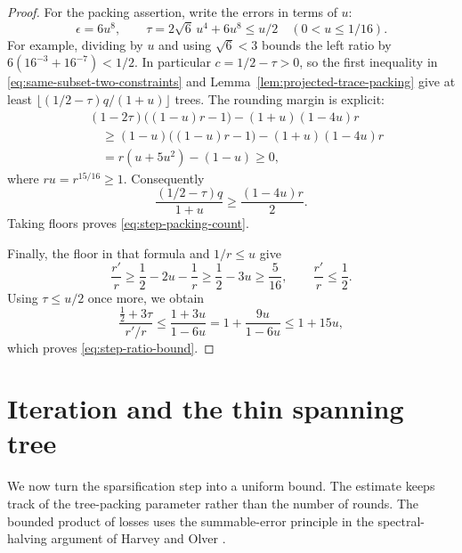 \documentclass[11pt]{amsart}
\theoremstyle{definition}
\theoremstyle{remark}
\numberwithin{equation}{section}
\begin{document}
\begin{proof}
For the packing assertion, write the errors in terms of $u$:
\[
 \epsilon=6u^8,\qquad\tau=2\sqrt6\,u^4+6u^8\leq u/2
 \quad(0<u\leq1/16).
\]
For example, dividing by $u$ and using $\sqrt6<3$ bounds the left
ratio by $6(16^{-3}+16^{-7})<1/2$.
In particular $c=1/2-\tau>0$, so the first inequality in
\eqref{eq:same-subset-two-constraints} and
Lemma~\ref{lem:projected-trace-packing} give at least
$\lfloor(1/2-\tau)q/(1+u)\rfloor$ trees.
The rounding margin is explicit:
\begin{align*}
 &(1-2\tau)\bigl((1-u)r-1\bigr)
            -(1+u)(1-4u)r\\
 &\quad\geq(1-u)\bigl((1-u)r-1\bigr)
            -(1+u)(1-4u)r\\
 &\quad=r(u+5u^2)-(1-u)\geq0,
\end{align*}
where $ru=r^{15/16}\geq1$.  Consequently
\[
 \frac{(1/2-\tau)q}{1+u}\geq\frac{(1-4u)r}{2}.
\]
Taking floors proves \eqref{eq:step-packing-count}.

Finally, the floor in that formula and $1/r\leq u$ give
\[
 \frac{r'}r\geq\frac12-2u-\frac1r
              \geq\frac12-3u\geq\frac5{16},
 \qquad\frac{r'}r\leq\frac12.
\]
Using $\tau\leq u/2$ once more, we obtain
\[
 \frac{\frac12+3\tau}{r'/r}
 \leq\frac{1+3u}{1-6u}
 =1+\frac{9u}{1-6u}\leq1+15u,
\]
which proves \eqref{eq:step-ratio-bound}.
\end{proof}

\section{Iteration and the thin spanning tree}\label{sec:iteration}

We now turn the sparsification step into a uniform bound.
The estimate keeps track of the tree-packing parameter rather than
the number of rounds.
The bounded product of losses uses the summable-error principle in
the spectral-halving argument of Harvey and Olver
\cite[Appendix~F, Claims~F.3--F.4]{HarveyOlver2014}.
\end{document}
